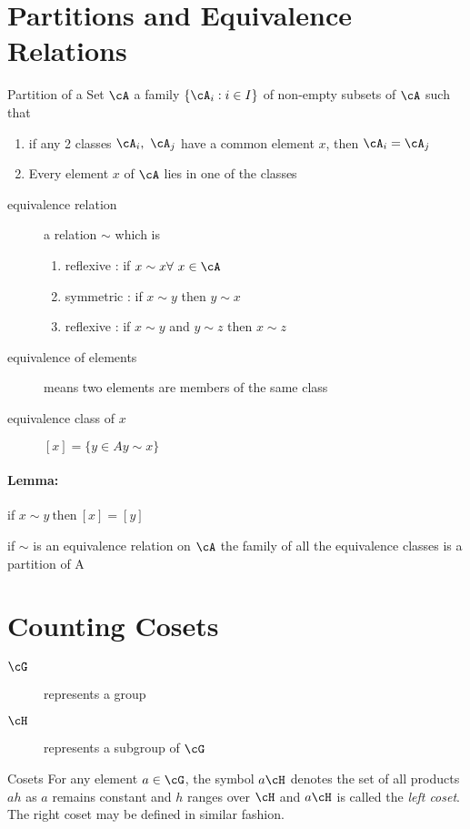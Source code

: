 \documentclass[11pt, oneside, dvipdfmx]{book}
\begin{document}
	\section{Partitions and Equivalence Relations}
	\begin{MyDefinition}{Partition of a Set $\cA$}
	a family $\{ \cA_i : i\in I\}$ of non-empty subsets of $\cA$ such that 
	\begin{enumerate}
	\item if any 2 classes $\cA_i, ~\cA_j$ have a common element $x$, then $\cA_i =\cA_j$
	
	\item Every element $x$ of $\cA$ lies in one of the classes
	\end{enumerate}
	\end{MyDefinition}
	
	\begin{description}
	\item[equivalence relation ] a relation $\sim $ which is
	\begin{enumerate}
	\item reflexive : if $x \sim x \forall~ x\in \cA$
	\item symmetric : if $x \sim y$ then $y \sim x$
	\item reflexive : if $x \sim y$ and $y \sim z$ then $x \sim z$
	\end{enumerate}
	\item[equivalence of elements] means two elements are members of the same class
	
	\item[equivalence class of $x$] $[x] =\{ y\in A y \sim x \}$
	\end{description}
	
	\paragraph{Lemma:}
	if $x \sim y ~\text{then}~ [x] = [y]$
	
	\begin{MyTheorem}
	if $\sim$ is an equivalence relation on $\cA$ the family of all the equivalence classes is a partition of A
	\end{MyTheorem}
	
	\section{Counting Cosets}
	\begin{description}
	\item[$\cG$] represents a group
	
	\item[$\cH$] represents a subgroup of $\cG$
	\end{description}
	\begin{MyDefinition}{Cosets}
	 For any element $a\in\cG$, the symbol $a\cH$ denotes the set of all products $ah$ as $a$ remains constant and $h$ ranges over $\cH$ and $a\cH$ is called the \textit{left coset}. The right coset may be defined in similar fashion.
	\end{MyDefinition}
	
\end{document}
